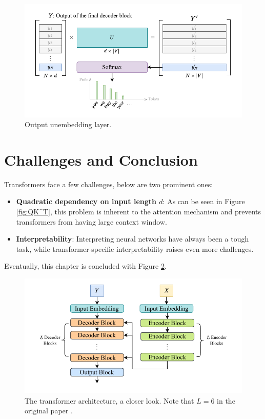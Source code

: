 \begin{figure}
    \centering
    \includegraphics[width=1\linewidth]{fig/unembedding.pdf}
    \caption{Output unembedding layer.}
    \label{fig:unembedding}
\end{figure}

\section{Challenges and Conclusion}

Transformers face a few challenges, below are two prominent ones:

\begin{itemize}
    \item \textbf{Quadratic dependency on input length $d$}: As can be seen in Figure \ref{fig:QK^T}, this problem is inherent to the attention mechanism and prevents transformers from having large context window.
    \item \textbf{Interpretability}: Interpreting neural networks have always been a tough task, while transformer-specific interpretability \cite{mohebbi-etal-2024-transformer-interpret} raises even more challenges.
\end{itemize}

Eventually, this chapter is concluded with Figure \ref{fig:transformer}.




\begin{figure}
    \centering
    \includegraphics[width=1\linewidth]{fig/transformer.pdf}
    \caption{The transformer architecture, a closer look. Note that $L=6$ in the original paper \cite{vaswani2017attention}.}
    \label{fig:transformer}
\end{figure}